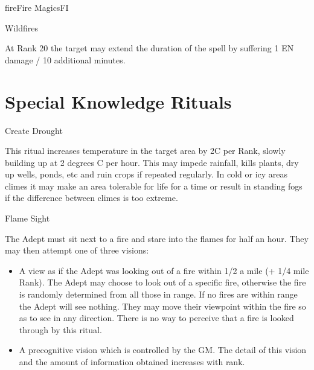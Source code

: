 \begin{College}[2.0]{fire}{Fire Magics}{FI}
\begin{spell}[S-14]{Wildfires}
\begin{effects}
At Rank 20 the target may extend the duration of the spell by
suffering 1 EN damage / 10 additional minutes.
\end{effects}
\end{spell}

\section{Special Knowledge Rituals}

\begin{ritual}[R-1]{Create Drought}

\begin{effects}
This ritual increases temperature in the target area by 2C per Rank,
slowly building up at 2 degrees C per hour. This may impede rainfall,
kills plants, dry up wells, ponds, etc and ruin crops if repeated
regularly.  In cold or icy areas climes it may make an area tolerable
for life for a time or result in standing fogs if the difference
between climes is too extreme.
\end{effects}
\end{ritual}

\begin{ritual}[R-2]{Flame Sight}

\begin{effects}
The Adept must sit next to a fire and stare into the flames for half
an hour.  They may then attempt one of three visions:

\begin{itemize}
\item A view as if the Adept was looking out of a fire within 1/2 a
  mile (+ 1/4 mile Rank).  The Adept may choose to look out of a
  specific fire, otherwise the fire is randomly determined from all
  those in range.  If no fires are within range the Adept will see
  nothing.  They may move their viewpoint within the fire so as to see
  in any direction. There is no way to perceive that a fire is looked
  through by this ritual.

\item A precognitive vision which is controlled by the GM.  The detail
  of this vision and the amount of information obtained increases with
  rank.


\end{itemize}
\end{effects}
\end{ritual}
\end{College}
